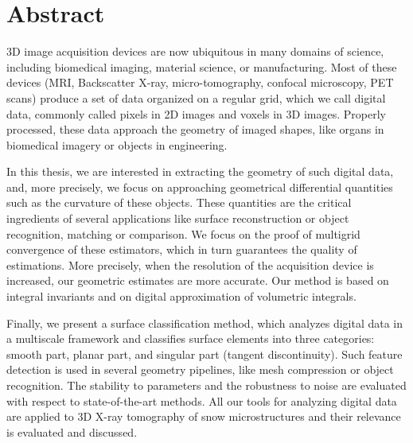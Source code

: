 %
%
%
\chapter*{Abstract}
\label{sec:abstract}
\vspace*{-10mm}

3D image acquisition devices are now ubiquitous in many domains of science,
including biomedical imaging, material science, or manufacturing. Most of these
devices (MRI, Backscatter X-ray, micro-tomography, confocal microscopy, PET scans)
produce a set of data organized on a regular grid, which we call digital data,
commonly called pixels in 2D images and voxels in 3D images. Properly processed,
these data approach the geometry of imaged shapes, like organs in biomedical
imagery or objects in engineering.

In this thesis, we are interested in extracting the geometry of such digital
data, and, more precisely, we focus on approaching geometrical differential
quantities such as the curvature of these objects. These quantities are the
critical ingredients of several applications like surface reconstruction or
object recognition, matching or comparison. We focus on the proof of multigrid
convergence of these estimators, which in turn guarantees the quality of
estimations. More precisely, when the resolution of the acquisition device is
increased, our geometric estimates are more accurate. Our method is based on
integral invariants and on digital approximation of volumetric integrals.

Finally, we present a surface classification method, which analyzes digital data
in a multiscale framework and classifies surface elements into three categories:
smooth part, planar part, and singular part (tangent discontinuity). Such
feature detection is used in several geometry pipelines, like mesh compression
or object recognition. The stability to parameters and the robustness to noise
are evaluated with respect to state-of-the-art methods. All our tools for
analyzing digital data are applied to 3D X-ray tomography of snow
microstructures and their relevance is evaluated and discussed.

\clearpage

